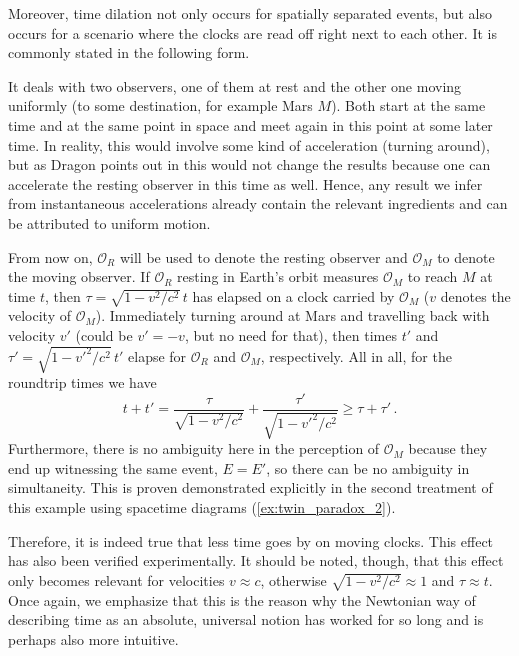 Moreover, time dilation not only occurs for spatially separated events, but also occurs for a scenario where the clocks are read off right next to each other. It is commonly stated in the following form.
\begin{ex}\label{ex:twin_paradox_1}
It deals with two observers, one of them at rest and the other one moving uniformly (to some destination, for example Mars $M$). Both start at the same time and at the same point in space and meet again in this point at some later time. In reality, this would involve some kind of acceleration (turning around), but as Dragon points out in \cite{dragon_geometry_srt} this would not change the results because one can accelerate the resting observer in this time as well. Hence, any result we infer from instantaneous accelerations already contain the relevant ingredients and can be attributed to uniform motion.

From now on, $\mathcal{O}_R$ will be used to denote the resting observer and $\mathcal{O}_M$ to denote the moving observer. If $\mathcal{O}_R$ resting in Earth's orbit measures $\mathcal{O}_M$ to reach $M$ at time $t$, then $\tau = \sqrt{1 - v^2 / c^2} \, t$ has elapsed on a clock carried by $\mathcal{O}_M$ ($v$ denotes the velocity of $\mathcal{O}_M$). Immediately turning around at Mars and travelling back with velocity $v'$ (could be $v' = -v$, but no need for that), then times $t'$ and $\tau' = \sqrt{1 - v'^2 / c^2} \, t'$ elapse for $\mathcal{O}_R$ and $\mathcal{O}_M$, respectively. All in all, for the roundtrip times we have
\begin{equation*}
t + t' = \frac{\tau}{\sqrt{1 - v^2 / c^2}} + \frac{\tau'}{\sqrt{1 - v'^2 / c^2}} \geq \tau + \tau' \, .
\end{equation*}
Furthermore, there is no ambiguity here in the perception of $\mathcal{O}_M$ because they end up witnessing the same event, $E = E'$, so there can be no ambiguity in simultaneity. This is proven demonstrated explicitly in the second treatment of this example using spacetime diagrams (\ref{ex:twin_paradox_2}).
\end{ex}
Therefore, it is indeed true that less time goes by on moving clocks. This effect has also been verified experimentally. It should be noted, though, that this effect only becomes relevant for velocities $v \approx c$, otherwise $\sqrt{1 - v^2 / c^2} \approx 1$ and $\tau \approx t$. Once again, we emphasize that this is the reason why the Newtonian way of describing time as an absolute, universal notion has worked for so long and is perhaps also more intuitive.\\


